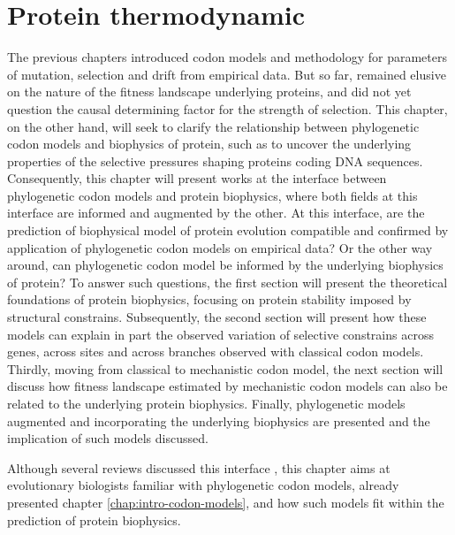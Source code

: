 \chapter{Protein thermodynamic}
{\hypersetup{linkcolor=GREYDARK}\minitoc}
\label{chap:intro-physic-proteins}

The previous chapters introduced codon models and methodology for parameters of mutation, selection and drift from empirical data. But so far, remained elusive on the nature of the fitness landscape underlying proteins, and did not yet question the causal determining factor for the strength of selection.
This chapter, on the other hand, will seek to clarify the relationship between phylogenetic codon models and biophysics of protein, such as to uncover the underlying properties of the selective pressures shaping proteins coding \acrshort{DNA} sequences.
Consequently, this chapter will present works at the interface between phylogenetic codon models and protein biophysics, where both fields at this interface are informed and augmented by the other. 
At this interface, are the prediction of biophysical model of protein evolution compatible and confirmed by application of phylogenetic codon models on empirical data?
Or the other way around, can phylogenetic codon model be informed by the underlying biophysics of protein?
To answer such questions, the first section will present the theoretical foundations of protein biophysics, focusing on protein stability imposed by structural constrains.
Subsequently, the second section will present how these models can explain in part the observed variation of selective constrains across genes, across sites and across branches observed with classical codon models.
Thirdly, moving from classical to mechanistic codon model, the next section will discuss how fitness landscape estimated by mechanistic codon models can also be related to the underlying protein biophysics.
Finally, phylogenetic models augmented and incorporating the underlying biophysics are presented and the implication of such models discussed.

Although several reviews discussed this interface \citep{Serohijos2014,Sikosek2014,Arenas2015,Echave2017,Bastolla2017}, this chapter aims at evolutionary biologists familiar with phylogenetic codon models, already presented chapter \ref{chap:intro-codon-models}, and how such models fit within the prediction of protein biophysics.

